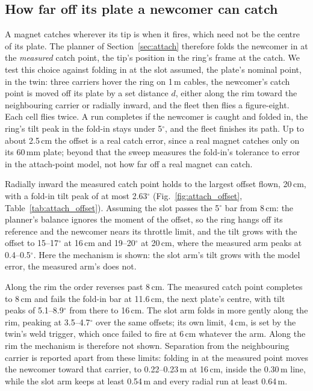 \subsection{How far off its plate a newcomer can catch}
\label{sec:res_attach_offset}

A magnet catches wherever its tip is when it fires, which need not be the centre of its plate. The planner of
Section~\ref{sec:attach} therefore folds the newcomer in at the \emph{measured} catch point, the tip's position in
the ring's frame at the catch. We test this choice against folding in at the slot assumed, the plate's nominal
point, in the twin: three carriers hover the ring on 1\,m cables, the newcomer's catch point is moved off its plate
by a set distance $d$, either along the rim toward the neighbouring carrier or radially inward, and the fleet then
flies a figure-eight. Each cell flies twice. A run completes if the newcomer is caught and folded in, the ring's tilt
peak in the fold-in stays under 5$^\circ$, and the fleet finishes its path. Up to about 2.5\,cm the offset is a
real catch error, since a real magnet catches only on its 60\,mm plate; beyond that the sweep measures the fold-in's
tolerance to error in the attach-point model, not how far off a real magnet can catch.

Radially inward the measured catch point holds to the largest offset flown, 20\,cm, with a fold-in tilt peak of at
most 2.63$^\circ$ (Fig.~\ref{fig:attach_offset}, Table~\ref{tab:attach_offset}). Assuming the slot passes the
5$^\circ$ bar from 8\,cm: the planner's balance ignores the moment of the offset, so the ring hangs off its
reference and the newcomer nears its throttle limit, and the tilt grows with the offset to 15--17$^\circ$ at
16\,cm and 19--20$^\circ$ at 20\,cm, where the measured arm peaks at 0.4--0.5$^\circ$. Here the mechanism is shown: the slot arm's tilt grows with the model error, the measured arm's does not.

Along the rim the order reverses past 8\,cm. The measured catch point completes to 8\,cm and fails the fold-in bar at 11.6\,cm, the next plate's centre,
with tilt peaks of 5.1--8.9$^\circ$ from there to 16\,cm. The slot arm folds in more gently along the rim, peaking at
3.5--4.7$^\circ$ over the same offsets; its own limit, 4\,cm, is
set by the twin's weld trigger, which once failed to fire at 6\,cm whatever the arm. Along the rim the mechanism is
therefore not shown. Separation from the neighbouring carrier is reported apart from these limits: folding in at the
measured point moves the newcomer toward that carrier, to 0.22--0.23\,m at 16\,cm, inside the 0.30\,m line, while
the slot arm keeps at least 0.54\,m and every radial run at least 0.64\,m.

